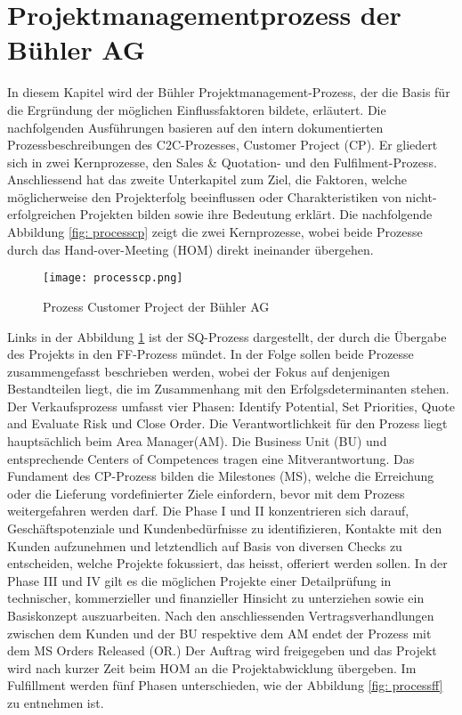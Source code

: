 \section{Projektmanagementprozess der Bühler AG}\label{sec:pmbueh}
In diesem Kapitel wird der Bühler Projektmanagement-Prozess, der die Basis für die Ergründung der möglichen Einflussfaktoren bildete, erläutert. Die nachfolgenden Ausführungen basieren auf den intern dokumentierten Prozessbeschreibungen des C2C-Prozesses, Customer Project (CP). Er gliedert sich in zwei Kernprozesse, den Sales \& Quotation- und den Fulfilment-Prozess. Anschliessend hat das zweite Unterkapitel zum Ziel, die Faktoren, welche möglicherweise den Projekterfolg beeinflussen oder Charakteristiken von nicht-erfolgreichen Projekten bilden sowie ihre Bedeutung erklärt.
Die nachfolgende Abbildung \ref{fig: processcp} zeigt die zwei Kernprozesse, wobei beide Prozesse durch das Hand-over-Meeting (HOM) direkt ineinander übergehen. 
\begin{figure}[H]
	\centering
	\texttt{[image: processcp.png]}
	\caption{Prozess Customer Project der Bühler AG}
	\label{fig:processcp}
\end{figure}
Links in der Abbildung \ref{fig:processcp} ist der SQ-Prozess dargestellt, der durch die Übergabe des Projekts in den FF-Prozess mündet. In der Folge sollen beide Prozesse zusammengefasst beschrieben werden, wobei der Fokus auf denjenigen Bestandteilen liegt, die im Zusammenhang mit den Erfolgsdeterminanten stehen. Der Verkaufsprozess umfasst vier Phasen: Identify Potential, Set Priorities, Quote and Evaluate Risk und Close Order. Die Verantwortlichkeit für den Prozess liegt hauptsächlich beim Area Manager(AM). Die Business Unit (BU) und entsprechende Centers of Competences tragen eine Mitverantwortung. Das Fundament des CP-Prozess bilden die Milestones (MS), welche die Erreichung oder die Lieferung vordefinierter Ziele einfordern, bevor mit dem Prozess weitergefahren werden darf. Die Phase I und II konzentrieren sich darauf, Geschäftspotenziale und Kundenbedürfnisse zu identifizieren, Kontakte mit den Kunden aufzunehmen und letztendlich auf Basis von diversen Checks zu entscheiden,  welche Projekte fokussiert, das heisst, offeriert werden sollen. In der Phase III und IV gilt es die möglichen Projekte einer Detailprüfung in technischer, kommerzieller und finanzieller Hinsicht zu unterziehen sowie ein Basiskonzept auszuarbeiten. Nach den anschliessenden Vertragsverhandlungen zwischen dem Kunden und der BU respektive dem AM endet der Prozess mit dem MS Orders Released (OR.) Der Auftrag wird freigegeben und das Projekt wird nach kurzer Zeit beim HOM an die Projektabwicklung übergeben. Im Fulfillment werden fünf Phasen unterschieden, wie der Abbildung \ref{fig: processff} zu entnehmen ist.
